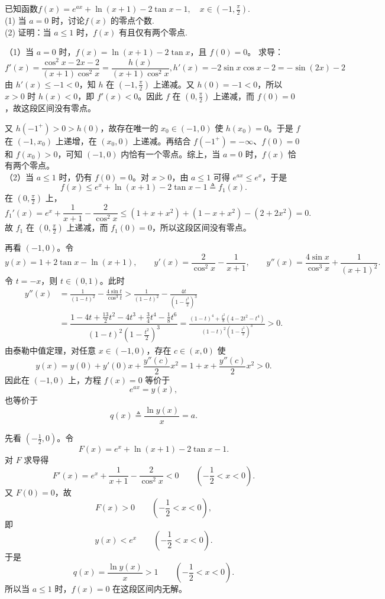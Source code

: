 \newpage
\begin{example}[零点个数题]
已知函数$f(x)=e^{ax}+\ln(x+1)-2\tan x-1,\quad x\in\left(-1,\frac\pi2\right).$\\
(1) 当 $a=0$ 时，讨论$f(x)$ 的零点个数.\\
(2) 证明：当 $a\leqslant1$ 时，$f(x)$ 有且仅有两个零点.
\end{example}
\begin{solution}
（1）当 $a=0$ 时，$f(x)=\ln(x+1)-2\tan x$，且 $f(0)=0$。
求导：$$f'(x) = \frac{\cos^2 x - 2x - 2}{(x+1)\cos^2 x}=\frac{h(x)}{(x+1)\cos^2 x},h'(x) = -2\sin x \cos x - 2 = -\sin(2x) - 2$$
由 $h'(x)\le -1<0$，知 $h$ 在 $\left(-1,\frac{\pi}{2}\right)$ 上递减。又 $h(0)=-1<0$，所以 $x>0$ 时 $h(x)<0$，即 $f'(x)<0$。因此 $f$ 在 $\left(0,\frac{\pi}{2}\right)$ 上递减，而 $f(0)=0$，故这段区间没有零点。

又 $h(-1^+)>0>h(0)$，故存在唯一的 $x_0\in(-1,0)$ 使 $h(x_0)=0$。于是 $f$ 在 $(-1,x_0)$ 上递增，在 $(x_0,0)$ 上递减。再结合 $f(-1^+)=-\infty$、$f(0)=0$ 和 $f(x_0)>0$，可知 $(-1,0)$ 内恰有一个零点。综上，当 $a=0$ 时，$f(x)$ 恰有两个零点。\\
（2）当 $a \leqslant 1$ 时，仍有 $f(0)=0$。对 $x>0$，由 $a\le1$ 可得 $e^{ax}\le e^x$，于是
\[
f(x)\le e^x+\ln(x+1)-2\tan x-1\triangleq f_1(x).
\]
在 $\left(0,\frac{\pi}{2}\right)$ 上，
\[
f_1'(x)=e^x+\frac{1}{x+1}-\frac{2}{\cos^2 x}
\le (1+x+x^2)+(1-x+x^2)-(2+2x^2)=0.
\]
故 $f_1$ 在 $\left(0,\frac{\pi}{2}\right)$ 上递减，而 $f_1(0)=0$，所以这段区间没有零点。

再看 $(-1,0)$。令
\[
y(x) = 1 + 2\tan x - \ln(x+1),\qquad
y'(x) = \frac{2}{\cos^2 x} - \frac{1}{x+1},\qquad
y''(x) = \frac{4\sin x}{\cos^3 x} + \frac{1}{(x+1)^2}.
\]
令 $t = -x$，则 $t \in (0, 1)$。此时
\begin{align*}
y''(x) &= \frac{1}{(1-t)^2} - \frac{4\sin t}{\cos^3 t}>\frac{1}{(1-t)^2}-\frac{4t}{(1-\frac{t^2}2)^3}\\
&=\dfrac{1 - 4t + \frac{13}{2}t^2 - 4t^3 + \frac{3}{4}t^4 - \frac{1}{8}t^6}{(1-t)^2(1-\frac{t^2}2)^3}
=\frac{(1-t)^4 + \frac{t^2}{8}(4 - 2t^2 - t^4)}{(1-t)^2(1-\frac{t^2}2)^3}>0.
\end{align*}
由泰勒中值定理，对任意 $x \in (-1, 0)$，存在 $c \in (x, 0)$ 使
\[
y(x) = y(0) + y'(0)x + \frac{y''(c)}{2}x^2= 1 + x + \frac{y''(c)}{2}x^2>0.
\]
因此在 $(-1,0)$ 上，方程 $f(x)=0$ 等价于
\[
e^{ax}=y(x),
\]
也等价于
\[
q(x)\triangleq \frac{\ln y(x)}{x}=a.
\]

先看 $\left(-\frac12,0\right)$。令
\[
F(x)=e^x+\ln(x+1)-2\tan x-1.
\]
对 \(F\) 求导得
\[
F'(x)=e^x+\frac{1}{x+1}-\frac{2}{\cos^2 x}<0\qquad \left(-\frac12<x<0\right).
\]
又 $F(0)=0$，故
\[
F(x)>0\qquad \left(-\frac12<x<0\right),
\]
即
\[
y(x)<e^x\qquad \left(-\frac12<x<0\right).
\]
于是
\[
q(x)=\frac{\ln y(x)}{x}>1\qquad \left(-\frac12<x<0\right).
\]
所以当 $a\le1$ 时，$f(x)=0$ 在这段区间内无解。


\end{solution}
